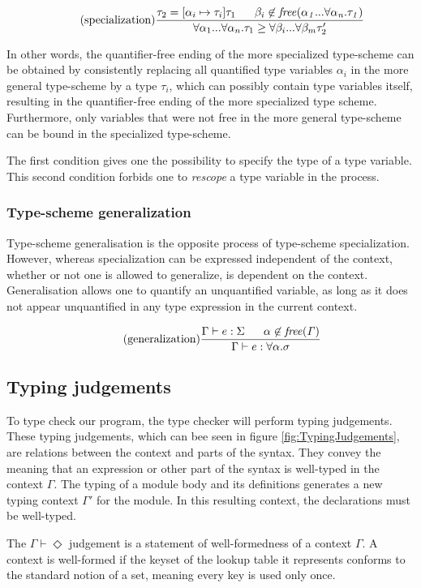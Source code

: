 \documentclass[10pt,a4paper,draft]{article}
\begin{document}
\begin{flushleft}
\[
\tag{specialization}
\frac{\tau_{2}=[\alpha_{i} \mapsto \tau_{i}]\tau_{1} \;\;\;\;\;\; \beta_{i} \not\in\mathit{free(\alpha_{1}...\forall \alpha_{n}.\tau_{1})}}
{\forall\alpha_{1}...\forall\alpha_{n}.\tau_{1}\geq \forall \beta_{i}...\forall \beta_{m}\tau_{2}'}
\]

In other words, the quantifier-free ending of the more specialized type-scheme can be obtained by consistently replacing all quantified type variables $\alpha_{i}$ in the more general type-scheme by a type $\tau_{i}$, which can possibly contain type variables itself, resulting in the quantifier-free ending of the more specialized type scheme. Furthermore, only variables that were not free in the more general type-scheme can be bound in the specialized type-scheme.

The first condition gives one the possibility to specify the type of a type variable. This second condition forbids one to \emph{rescope} a type variable in the process.

\subsubsection{Type-scheme generalization}
Type-scheme generalisation is the opposite process of type-scheme specialization. However, whereas specialization can be expressed independent of the context, whether or not one is allowed to generalize, is dependent on the context. Generalisation allows one to quantify an unquantified variable, as long as it does not appear unquantified in any type expression in the current context.

\[
\tag{generalization}
\frac{\Gamma \vdash e:\Sigma \;\;\;\;\;\; \alpha \not\in \mathit{free(\Gamma)}}{\Gamma \vdash e : \forall \alpha . \sigma}
\]


\subsection{Typing judgements}
To type check our program, the type checker will perform typing judgements. These typing judgements, which can bee seen in figure \ref{fig:TypingJudgements}, are relations between the context and parts of the syntax. They convey the meaning that an expression or other part of the syntax is well-typed in the context $\Gamma$. The typing of a module body and its definitions generates a new typing context $\Gamma'$ for the module. In this resulting context, the declarations must be well-typed.

The $\Gamma \vdash \Diamond$ judgement is a statement of well-formedness of a context $\Gamma$. A context is well-formed if the keyset of the lookup table it represents conforms to the standard notion of a set, meaning every key is used only once.


\end{flushleft}
\end{document}
